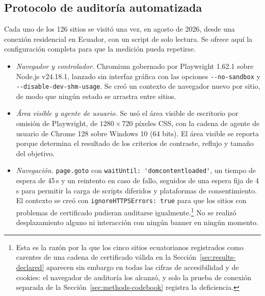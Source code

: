 \documentclass[pdflatex,sn-basic,Numbered,iicol]{sn-jnl}
\theoremstyle{thmstyleone}
\theoremstyle{thmstyletwo}
\theoremstyle{thmstylethree}
\begin{document}
\subsection{Protocolo de auditor\'ia automatizada}\label{sec:methods-audit}

Cada uno de los 126 sitios se visit\'o una vez, en agosto de 2026, desde una conexi\'on residencial en Ecuador, con un script de solo lectura. Se ofrece aqu\'i la configuraci\'on completa para que la medici\'on pueda repetirse.

\begin{itemize}
	\item \emph{Navegador y controlador.} Chromium gobernado por Playwright 1.62.1 \citep{playwright2026} sobre Node.js v24.18.1, lanzado sin interfaz gr\'afica con las opciones \verb|--no-sandbox| y \verb|--disable-dev-shm-usage|. Se cre\'o un contexto de navegador nuevo por sitio, de modo que ning\'un estado se arrastra entre sitios.
	\item \emph{\'Area visible y agente de usuario.} Se us\'o el \'area visible de escritorio por omisi\'on de Playwright, de $1280 \times 720$ p\'ixeles CSS, con la cadena de agente de usuario de Chrome 128 sobre Windows 10 (64 bits). El \'area visible se reporta porque determina el resultado de los criterios de contraste, reflujo y tama\~no del objetivo.
	\item \emph{Navegaci\'on.} \verb|page.goto| con \verb|waitUntil: 'domcontentloaded'|, un tiempo de espera de 45\,s y un reintento en caso de fallo, seguidos de una espera fija de 4\,s para permitir la carga de scripts diferidos y plataformas de consentimiento. El contexto se cre\'o con \verb|ignoreHTTPSErrors: true| para que los sitios con problemas de certificado pudieran auditarse igualmente.\footnote{Esta es la raz\'on por la que los cinco sitios ecuatorianos registrados como carentes de una cadena de certificado v\'alida en la Secci\'on~\ref{sec:results-declared} aparecen sin embargo en todas las cifras de accesibilidad y de cookies: el navegador de auditor\'ia los alcanz\'o, y solo la prueba de conexi\'on separada de la Secci\'on~\ref{sec:methods-codebook} registra la deficiencia.} No se realiz\'o desplazamiento alguno ni interacci\'on con ning\'un banner en ning\'un momento.

\end{itemize}
\end{document}
